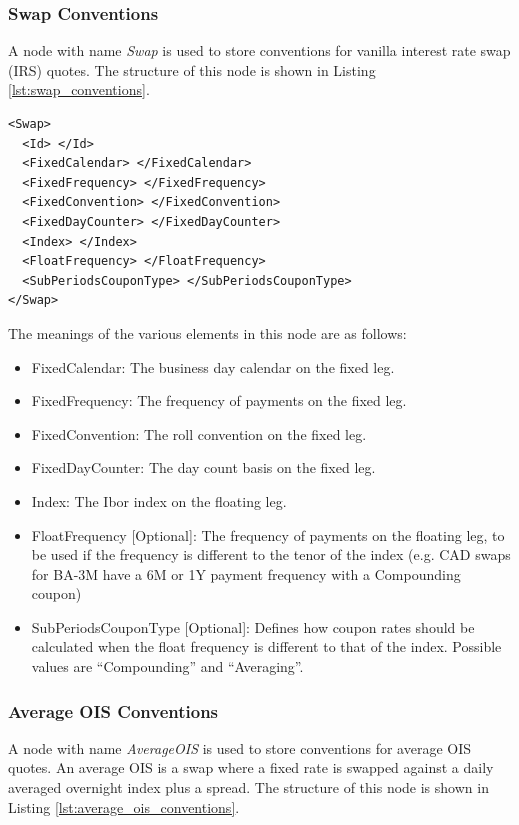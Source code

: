 \subsubsection{Swap Conventions}
A node with name \emph{Swap} is used to store conventions for vanilla interest rate swap (IRS) quotes. The structure of
this node is shown in Listing \ref{lst:swap_conventions}.

\begin{listing}[H]
\begin{verbatim}
<Swap>
  <Id> </Id>
  <FixedCalendar> </FixedCalendar>
  <FixedFrequency> </FixedFrequency>
  <FixedConvention> </FixedConvention>
  <FixedDayCounter> </FixedDayCounter>
  <Index> </Index>
  <FloatFrequency> </FloatFrequency>
  <SubPeriodsCouponType> </SubPeriodsCouponType>
</Swap>
\end{verbatim}
\caption{Swap conventions}
\label{lst:swap_conventions}
\end{listing}

The meanings of the various elements in this node are as follows:
\begin{itemize}
\item FixedCalendar: The business day calendar on the fixed leg.
\item FixedFrequency: The frequency of payments on the fixed leg.
\item FixedConvention: The roll convention on the fixed leg.
\item FixedDayCounter: The day count basis on the fixed leg.
\item Index: The Ibor index on the floating leg.
\item FloatFrequency [Optional]: The frequency of payments on the floating leg, to be used if the frequency is different to the tenor of the index (e.g. CAD swaps for BA-3M have a 6M or 1Y payment frequency with a Compounding coupon)
\item SubPeriodsCouponType [Optional]: Defines how coupon rates should be calculated when the float frequency is different to that of the index. Possible values are ``Compounding'' and ``Averaging''.
\end{itemize}

\subsubsection{Average OIS Conventions}
A node with name \emph{AverageOIS} is used to store conventions for average OIS quotes. An average OIS is a swap where a
fixed rate is swapped against a daily averaged overnight index plus a spread. The structure of this node is shown in
Listing \ref{lst:average_ois_conventions}.

